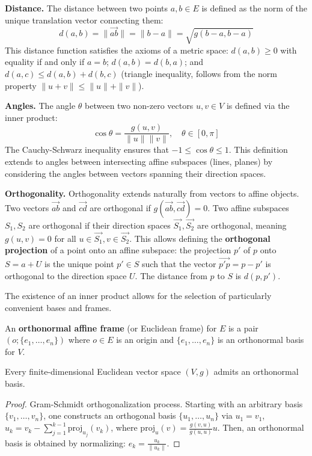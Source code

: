 \textbf{Distance.} The distance between two points $a, b \in E$ is defined as the norm of the unique translation vector connecting them:
\[
d(a, b) = \| \vec{ab} \| = \| b - a \| = \sqrt{g(b - a, b - a)}
\]
This distance function satisfies the axioms of a metric space: $d(a, b) \ge 0$ with equality if and only if $a = b$; $d(a, b) = d(b, a)$; and $d(a, c) \le d(a, b) + d(b, c)$ (triangle inequality, follows from the norm property $\| u + v \| \le \| u \| + \| v \|$).

\textbf{Angles.} The angle $\theta$ between two non-zero vectors $u, v \in V$ is defined via the inner product:
\[
\cos \theta = \frac{g(u, v)}{\| u \| \| v \|}, \quad \theta \in [0, \pi]
\]
The Cauchy-Schwarz inequality ensures that $-1 \le \cos \theta \le 1$. This definition extends to angles between intersecting affine subspaces (lines, planes) by considering the angles between vectors spanning their direction spaces.

\textbf{Orthogonality.} Orthogonality extends naturally from vectors to affine objects. Two vectors $\vec{ab}$ and $\vec{cd}$ are orthogonal if $g(\vec{ab}, \vec{cd}) = 0$. Two affine subspaces $S_1, S_2$ are orthogonal if their direction spaces $\vec{S_1}, \vec{S_2}$ are orthogonal, meaning $g(u, v) = 0$ for all $u \in \vec{S_1}, v \in \vec{S_2}$. This allows defining the \textbf{orthogonal projection} of a point onto an affine subspace: the projection $p'$ of $p$ onto $S = a + U$ is the unique point $p' \in S$ such that the vector $\vec{p'p} = p - p'$ is orthogonal to the direction space $U$. The distance from $p$ to $S$ is $d(p, p')$.

The existence of an inner product allows for the selection of particularly convenient bases and frames.

\begin{definition} \label{def:orthonormal_basis_frame}
An \textbf{orthonormal affine frame} (or Euclidean frame) for $E$ is a pair $(o; \{e_1, \dots, e_n\})$ where $o \in E$ is an origin and $\{e_1, \dots, e_n\}$ is an orthonormal basis for $V$.
\end{definition}

\begin{theorem} \label{thm:gram_schmidt}
Every finite-dimensional Euclidean vector space $(V, g)$ admits an orthonormal basis.
\end{theorem}
\begin{proof}
Gram-Schmidt orthogonalization process. Starting with an arbitrary basis $\{v_1, \dots, v_n\}$, one constructs an orthogonal basis $\{u_1, \dots, u_n\}$ via $u_1 = v_1$, $u_k = v_k - \sum_{j=1}^{k-1} \mathrm{proj}_{u_j}(v_k)$, where $\mathrm{proj}_u(v) = \frac{g(v, u)}{g(u, u)} u$. Then, an orthonormal basis is obtained by normalizing: $e_k = \frac{u_k}{\| u_k \|}$.
\end{proof}

